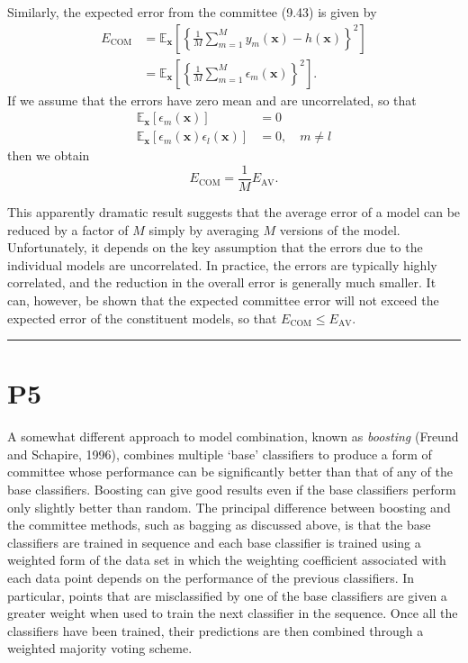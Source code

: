 \documentclass{article}
\begin{document}
Similarly, the expected error from the committee (9.43) is given by
\begin{align}
E_{\text{COM}} &= \mathbb{E}_{\mathbf{x}} \left[ \left\{ \frac{1}{M} \sum_{m=1}^{M} y_m(\mathbf{x}) - h(\mathbf{x}) \right\}^2 \right] \\
&= \mathbb{E}_{\mathbf{x}} \left[ \left\{ \frac{1}{M} \sum_{m=1}^{M} \epsilon_m(\mathbf{x}) \right\}^2 \right].
\tag{9.47}
\end{align}
If we assume that the errors have zero mean and are uncorrelated, so that
\begin{align}
\mathbb{E}_{\mathbf{x}} \left[ \epsilon_m(\mathbf{x}) \right] &= 0 \\
\mathbb{E}_{\mathbf{x}} \left[ \epsilon_m(\mathbf{x}) \epsilon_l(\mathbf{x}) \right] &= 0, \quad m \neq l
\tag{9.48, 9.49}
\end{align}
then we obtain
\begin{equation}
E_{\text{COM}} = \frac{1}{M} E_{\text{AV}}.
\tag{9.50}
\end{equation}

This apparently dramatic result suggests that the average error of a model can be reduced by a factor of $M$ simply by averaging $M$ versions of the model. Unfortunately, it depends on the key assumption that the errors due to the individual models are uncorrelated. In practice, the errors are typically highly correlated, and the reduction in the overall error is generally much smaller. It can, however, be shown that the expected committee error will not exceed the expected error of the constituent models, so that $E_{\text{COM}} \leqslant E_{\text{AV}}$.

\noindent\rule{\linewidth}{0.4pt}

\section{P5}

A somewhat different approach to model combination, known as \textit{boosting} (Freund and Schapire, 1996), combines multiple `base' classifiers to produce a form of committee whose performance can be significantly better than that of any of the base classifiers. Boosting can give good results even if the base classifiers perform only slightly better than random. The principal difference between boosting and the committee methods, such as bagging as discussed above, is that the base classifiers are trained in sequence and each base classifier is trained using a weighted form of the data set in which the weighting coefficient associated with each data point depends on the performance of the previous classifiers. In particular, points that are misclassified by one of the base classifiers are given a greater weight when used to train the next classifier in the sequence. Once all the classifiers have been trained, their predictions are then combined through a weighted majority voting scheme.
\end{document}
